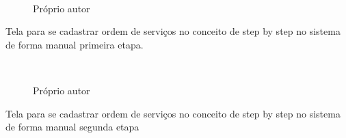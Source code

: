 \begin{figure}[H]
		\caption{\label{Cadastros_Sistema_1}Próprio autor}
	\centering
	\mbox{%
		\qquad
	}
	
\end{figure}
\newpage

Tela para se cadastrar ordem de serviços no conceito de  step by step no sistema de forma manual primeira etapa.

\begin{figure}[H]
		\caption{\label{step_1}Próprio autor}
	\centering
	\mbox{%
		\qquad
	}
	
\end{figure}
\newpage

Tela para se cadastrar ordem de serviços no conceito de  step by step no sistema de forma manual segunda etapa

